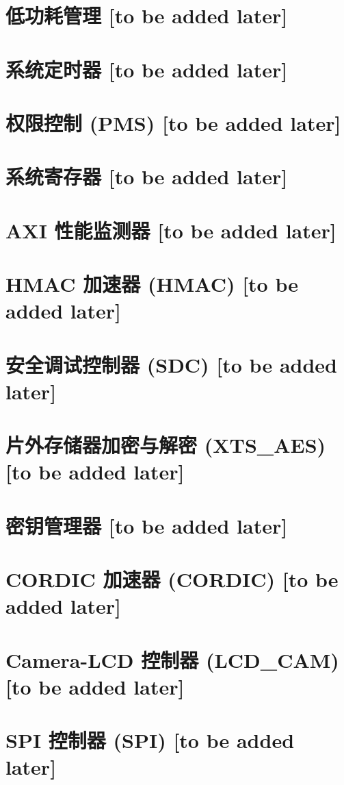 \documentclass{article}
\begin{document}
\section{低功耗管理 [to be added later]}\label{mod:lowpowm}
\section{系统定时器 [to be added later]}\label{mod:systimer}
\section{权限控制 (PMS) [to be added later]}\label{mod:permctrl}
\section{系统寄存器 [to be added later]}\label{mod:sysreg}
\section{AXI 性能监测器 [to be added later]}\label{mod:aximon}
\section{HMAC 加速器 (HMAC) [to be added later]}\label{mod:hmac}
\section{安全调试控制器 (SDC) [to be added later]}\label{mod:sdc}
\section{片外存储器加密与解密 (XTS\_AES) [to be added later]}\label{mod:extmemencr}
\section{密钥管理器 [to be added later]}\label{mod:keymng}
\section{CORDIC 加速器 (CORDIC) [to be added later]}\label{mod:cordic}
\section{Camera-LCD 控制器 (LCD\_CAM) [to be added later]}\label{mod:camlcdctrl}
\section{SPI 控制器 (SPI) [to be added later]}\label{mod:spi}
\end{document}
